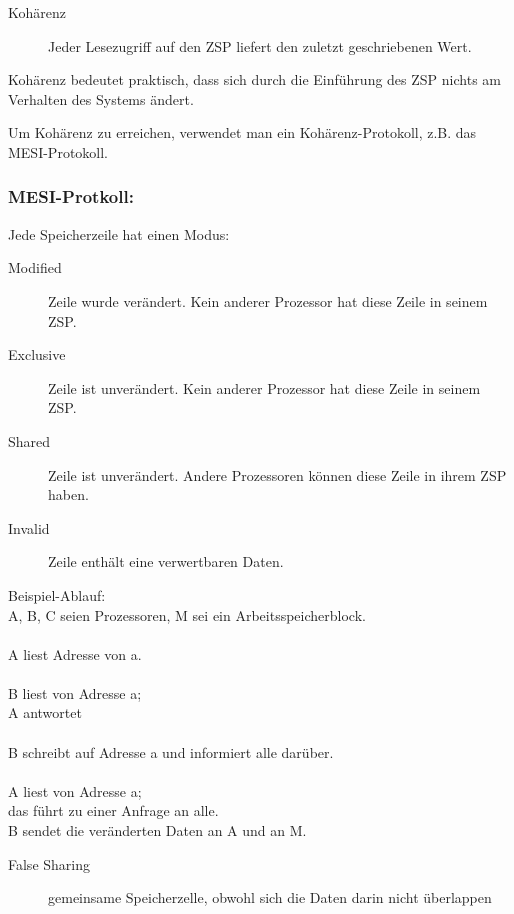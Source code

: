 \begin{description}
	\item[Kohärenz] Jeder Lesezugriff auf den ZSP liefert den zuletzt geschriebenen Wert.
\end{description}

Kohärenz bedeutet praktisch, dass sich durch die Einführung des ZSP nichts am Verhalten des Systems ändert.

Um Kohärenz zu erreichen, verwendet man ein Kohärenz-Protokoll, z.B. das MESI-Protokoll.

\subsubsection*{MESI-Protkoll:}

Jede Speicherzeile hat einen Modus:
\begin{description}
	\item[Modified] Zeile wurde verändert. Kein anderer Prozessor hat diese Zeile in seinem ZSP.
	\item[Exclusive] Zeile ist unverändert. Kein anderer Prozessor hat diese Zeile in seinem ZSP.
	\item[Shared] Zeile ist unverändert. Andere Prozessoren können diese Zeile in ihrem ZSP haben.
	\item[Invalid] Zeile enthält eine verwertbaren Daten.
\end{description}
Beispiel-Ablauf:\\
A, B, C seien Prozessoren, M sei ein Arbeitsspeicherblock.\\ %
\\
A liest Adresse von a.\\ %
\\
B liest von Adresse a;\\
A antwortet\\ %
\\
B schreibt auf Adresse a und informiert alle darüber.\\ %
\\
A liest von Adresse a;\\
das führt zu einer Anfrage an alle.\\
B sendet die veränderten Daten an A und an M.

\begin{description}
	\item[False Sharing] gemeinsame Speicherzelle, obwohl sich die Daten darin nicht überlappen
\end{description}

